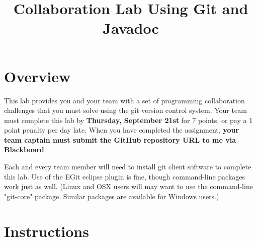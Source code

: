 \documentclass{article}
\title{Collaboration Lab Using Git and Javadoc}
\begin{document}

\maketitle

\section{Overview}
This lab provides you and your team with a set of programming collaboration challenges that you must solve using the git version control system.
\footnotemark{} Your team must complete this lab by {\bf Thursday, September 21st} for 7 points, or pay a 1 point penalty per day late. When you have completed the assignment, {\bf your team captain must submit the GitHub repository URL to me via Blackboard}.

Each and every team member will need to install git client software to complete this lab. Use of the EGit eclipse plugin is fine, though command-line packages work just as well. (Linux and OSX users will may want to use the command-line "git-core" package. Similar packages are available for Windows users.)

\section{Instructions}
\end{document}
